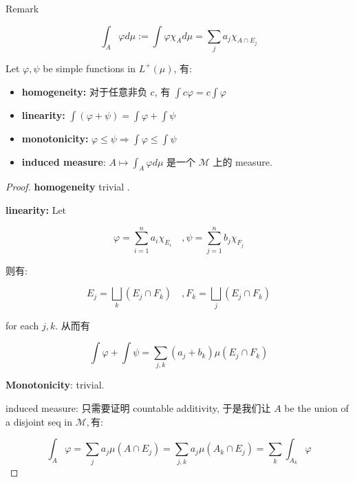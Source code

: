 \begin{qlremark}{Remark}

\[\int_{A}\varphi d\mu := \int\varphi\chi_{A} d\mu = \sum\limits_{j}a_{j}\chi_{A \cap E_{j}}\]

\end{qlremark}

\begin{proposition}{}

Let \(\varphi,\psi\) be simple functions in \(L^{+}(\mu)\), 有:

\begin{itemize}
\item
  \textbf{homogeneity:} 对于任意非负 \(c\), 有 \(\int c\varphi = c\int\varphi\)
\item
  \textbf{linearity:} \(\int(\varphi + \psi) = \int\varphi + \int\psi\)
\item
  \textbf{monotonicity:} \(\varphi \leq \psi\Longrightarrow\int\varphi \leq \int\psi\)
\item
  \textbf{induced measure}: \(A\mapsto\int_{A}\varphi d\mu\) 是一个 \(\mathcal{M}\) 上的 measure.
\end{itemize}

\end{proposition}

\begin{proof}

\textbf{homogeneity} trivial .

\textbf{linearity:} Let

\[\varphi = \sum\limits_{i = 1}^{n}a_{i}\chi_{E_{i}}\quad,\psi = \sum\limits_{j = 1}^{n}b_{j}\chi_{F_{j}}\]

则有:

\[E_{j} = \bigsqcup\limits_{k}(E_{j} \cap F_{k})\quad,F_{k} = \bigsqcup\limits_{j}(E_{j} \cap F_{k})\]

for each \(j,k\). 从而有

\[\int\varphi + \int\psi = \sum\limits_{j,k}(a_{j} + b_{k})\mu(E_{j} \cap F_{k})\]

\textbf{Monotonicity}: trivial.

induced measure: 只需要证明 countable additivity, 于是我们让 \(A\) be the union of a disjoint seq in \(\mathcal{M},\text{有}:\)

\[\int_{A}\varphi = \sum\limits_{j}a_{j}\mu(A \cap E_{j}) = \sum\limits_{j,k}a_{j}\mu(A_{k} \cap E_{j}) = \sum\limits_{k}\int_{A_{k}}\varphi\]

\end{proof}

